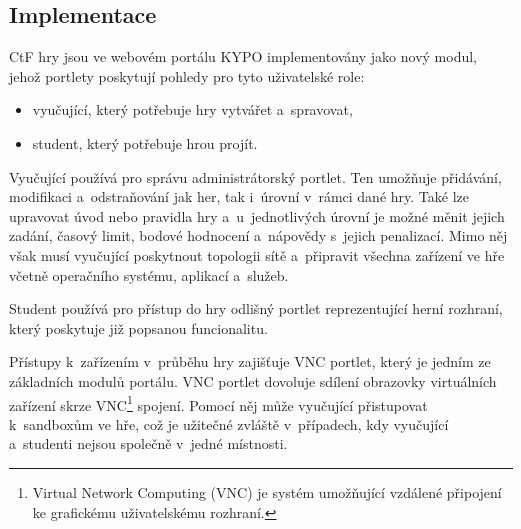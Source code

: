 \documentclass[
  digital, %
  oneside, %
  table,   %
  nolof,     %
  nolot,     %
]{fithesis3}
\begin{document}
\subsection{Implementace}
CtF hry jsou ve webovém portálu KYPO implementovány jako nový modul, jehož portlety poskytují pohledy pro tyto uživatelské role:
\begin{itemize}
  \item vyučující, který potřebuje hry vytvářet a~spravovat,
  \item student, který potřebuje hrou projít.
\end{itemize}
Vyučující používá pro správu administrátorský portlet. Ten umožňuje přidávání, modifikaci a~odstraňování jak her, tak i~úrovní v~rámci dané hry. Také lze upravovat úvod nebo pravidla hry a~u~jednotlivých úrovní je možné měnit jejich zadání, časový limit, bodové hodnocení a~nápovědy s~jejich penalizací. Mimo něj však musí vyučující poskytnout topologii sítě a~připravit všechna zařízení ve hře včetně operačního systému, aplikací a~služeb. \cite{ctfDesign, Dankovcikova2015thesis}\par
Student používá pro přístup do hry odlišný portlet reprezentující herní rozhraní, který poskytuje již popsanou funcionalitu.\par
Přístupy k~zařízením v~průběhu hry zajišťuje VNC portlet, který je jedním ze základních modulů portálu. VNC portlet dovoluje sdílení obrazovky virtuálních zařízení skrze VNC\footnote{Virtual Network Computing (VNC) je systém umožňující vzdálené připojení ke grafickému uživatelskému rozhraní.} spojení. Pomocí něj může vyučující přistupovat k~sandboxům ve hře, což je užitečné zvláště v~případech, kdy vyučující a~studenti nejsou společně v~jedné místnosti. \cite{ctfDesign}
\end{document}
